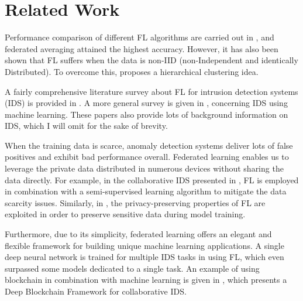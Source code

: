 
\section{Related Work}

Performance comparison of different FL algorithms are carried out in \cite{FLperf}, and federated averaging attained the highest accuracy.
However, it has also been shown that FL suffers when the data is non-IID (non-Independent and identically Distributed).
To overcome this, \cite{FL-HC} proposes a hierarchical clustering idea.

A fairly comprehensive literature survey about FL for intrusion detection systems (IDS) is provided in \cite{FLforIDSsurvey}.
A more general survey is given in \cite{IDSusingMLsurvey}, concerning IDS using machine learning.
These papers also provide lots of background information on IDS, which I will omit for the sake of brevity.

When the training data is scarce, anomaly detection systems deliver lots of false positives and exhibit bad performance overall.
Federated learning enables us to leverage the private data distributed in numerous devices without sharing the data directly.
For example, in the collaborative IDS presented in \cite{ColabIDS}, FL is employed in combination with a semi-supervised learning algorithm to mitigate the data scarcity issues.
Similarly, in \cite{FLwirelessIDS}, the privacy-preserving properties of FL are exploited in order to preserve sensitive data during model training.

Furthermore, due to its simplicity, federated learning offers an elegant and flexible framework for building unique machine learning applications.
A single deep neural network is trained for multiple IDS tasks in \cite{mt-dnn-fl} using FL, which even surpassed some models dedicated to a single task.
An example of using blockchain in combination with machine learning is given in \cite{dbf}, which presents a Deep Blockchain Framework for collaborative IDS.
